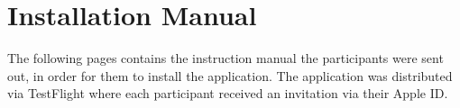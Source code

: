 \chapter{Installation Manual}
\label{appendix:installation}

The following pages contains the instruction manual the participants were sent out, in order for them to install the application. The application was distributed via TestFlight where each participant received an invitation via their Apple ID.



